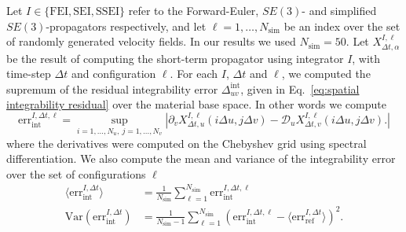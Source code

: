 \documentclass[]{cam-thesis}
\begin{document}
Let $I \in \{ \text{FEI}, \text{SEI}, \text{SSEI} \}$ refer to the Forward-Euler, $SE(3)$- and simplified $SE(3)$-propagators respectively, and let $\ell = 1, \dots, N_\text{sim}$ be an index over the set of randomly generated velocity fields. In our results we used $N_\text{sim} = 50$. Let $X_{\Delta t, \alpha}^{I, \ell}$ be the result of computing the short-term propagator using integrator $I$, with time-step $\Delta t$ and configuration $\ell$. For each $I$, $\Delta t$ and $\ell$, we computed the supremum of the residual integrability error $\Delta^\text{int}_{u v}$, given in Eq.~\ref{eq:spatial integrability residual} over the material base space. In other words we compute
\begin{equation}
	\text{err}_\text{int}^{I, \Delta t, \ell} = \sup_{ i = 1,\dots,N_u,\ j = 1,\dots, N_v } \left| \partial_v X_{\Delta t, u}^{I, \ell} (i \Delta u, j \Delta v) - \mathcal{D}_u X_{\Delta t, v}^{I, \ell} (i \Delta u, j \Delta v).
 \right|
\end{equation}
where the derivatives were computed on the Chebyshev grid using spectral differentiation. We also compute the mean and variance of the integrability error over the set of configurations $\ell$
\begin{subequations}
	\begin{align}
		\langle \text{err}_\text{int}^{I, \Delta t} \rangle & = \frac{1}{N_\text{sim}} \sum_{\ell = 1}^{N_\text{sim}} \text{err}_\text{int}^{I, \Delta t, \ell} \\
		\text{Var}( \text{err}_\text{int}^{I, \Delta t}) & = \frac{1}{N_\text{sim}-1} \sum_{\ell = 1}^{N_\text{sim}} ( \text{err}_\text{int}^{I, \Delta t, \ell} - \langle \text{err}_\text{ref}^{I, \Delta t} \rangle)^2.
	\end{align}
\end{subequations}
\end{document}
